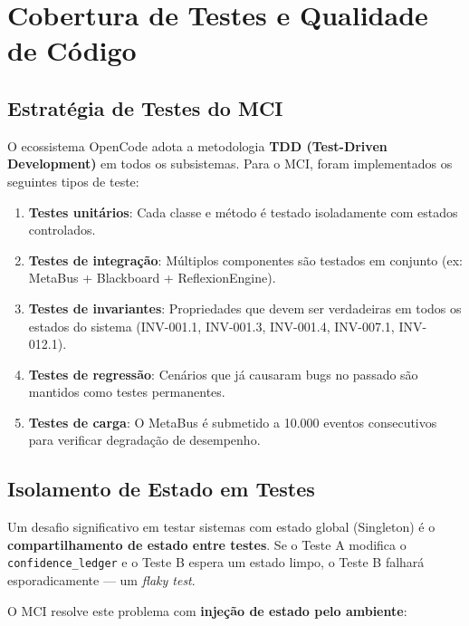 \section{Cobertura de Testes e Qualidade de Código}
\label{sec:testing}

\subsection{Estratégia de Testes do MCI}

O ecossistema OpenCode adota a metodologia \textbf{TDD (Test-Driven Development)} em todos os subsistemas. Para o MCI, foram implementados os seguintes tipos de teste:

\begin{enumerate}
    \item \textbf{Testes unitários}: Cada classe e método é testado isoladamente com estados controlados.
    \item \textbf{Testes de integração}: Múltiplos componentes são testados em conjunto (ex: MetaBus + Blackboard + ReflexionEngine).
    \item \textbf{Testes de invariantes}: Propriedades que devem ser verdadeiras em todos os estados do sistema (INV-001.1, INV-001.3, INV-001.4, INV-007.1, INV-012.1).
    \item \textbf{Testes de regressão}: Cenários que já causaram bugs no passado são mantidos como testes permanentes.
    \item \textbf{Testes de carga}: O MetaBus é submetido a 10.000 eventos consecutivos para verificar degradação de desempenho.
\end{enumerate}

\subsection{Isolamento de Estado em Testes}

Um desafio significativo em testar sistemas com estado global (Singleton) é o \textbf{compartilhamento de estado entre testes}. Se o Teste A modifica o \texttt{confidence\_ledger} e o Teste B espera um estado limpo, o Teste B falhará esporadicamente — um \textit{flaky test}.

O MCI resolve este problema com \textbf{injeção de estado pelo ambiente}:

